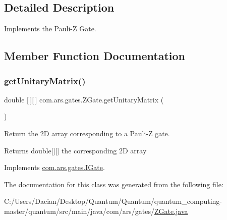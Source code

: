 \subsection{Detailed Description}
Implements the Pauli-\/Z Gate. 

\subsection{Member Function Documentation}
\hypertarget{classcom_1_1ars_1_1gates_1_1_z_gate_a1009d3144a50f50332e64b6e7f37b578}{}\label{classcom_1_1ars_1_1gates_1_1_z_gate_a1009d3144a50f50332e64b6e7f37b578} 
\subsubsection{\texorpdfstring{get\+Unitary\+Matrix()}{getUnitaryMatrix()}}
{\footnotesize\ttfamily double \mbox{[}$\,$\mbox{]}\mbox{[}$\,$\mbox{]} com.\+ars.\+gates.\+Z\+Gate.\+get\+Unitary\+Matrix (\begin{DoxyParamCaption}{ }\end{DoxyParamCaption})}

Return the 2D array corresponding to a Pauli-\/Z gate. \begin{DoxyReturn}{Returns}
double\mbox{[}\mbox{]}\mbox{[}\mbox{]} the corresponding 2D array 
\end{DoxyReturn}


Implements \hyperlink{interfacecom_1_1ars_1_1gates_1_1_i_gate_a6a940b3a6940cd97429aa211143121cb}{com.\+ars.\+gates.\+I\+Gate}.



The documentation for this class was generated from the following file\+:\begin{DoxyCompactItemize}
\item 
C\+:/\+Users/\+Dacian/\+Desktop/\+Quantum/\+Quantum/quantum\+\_\+computing-\/master/quantum/src/main/java/com/ars/gates/\hyperlink{_z_gate_8java}{Z\+Gate.\+java}\end{DoxyCompactItemize}
